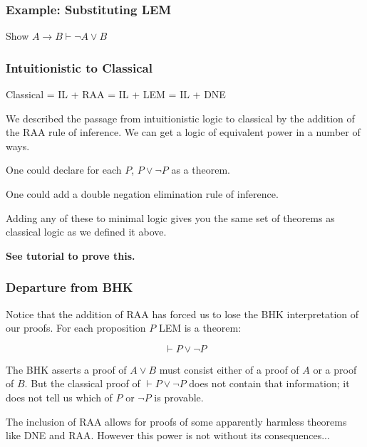 \documentclass{beamer}
\theoremstyle{indentDefn} \newtheorem{defn}[]{Definition}
\begin{document}
\begin{frame}
	\frametitle{Example: Substituting LEM}
	
	Show $A \rightarrow B \vdash \lnot A \lor B$
	
	\vspace{7cm}
		
	
\end{frame}

\begin{frame}
  \frametitle{Intuitionistic to Classical}

  	\begin{center}
	Classical = IL + RAA = IL + LEM = IL + DNE
	\end{center}

	\vspace{0.3cm}

    We described the passage from intuitionistic logic to classical by the addition of the RAA rule of inference. We can get a logic of equivalent power in a number of ways. 

    \vspace{0.3cm}

    One could declare for each $P$,  $P \lor \lnot P$ as a theorem. 

    \vspace{0.3cm}

    One could add a double negation elimination rule of inference. 

    \vspace{0.3cm}

    Adding any of these to minimal logic gives you the same set of theorems as classical logic as we defined it above. 

	{\bf See tutorial to prove this.}

\end{frame}

\begin{frame}
  \frametitle{Departure from BHK}

    Notice that the addition of RAA has forced us to lose the BHK interpretation of our proofs. For each proposition $P$ LEM is a theorem: 

    $$ \vdash P \lor \lnot P$$

    The BHK asserts a proof of $A \lor B$ must consist either of a proof of $A$ or a proof of $B$. But the classical proof of $\vdash P \lor \lnot P$ does not contain that information; it does not tell us which of $P$ or $\lnot P$ is provable. 

	\vspace{0.5cm}

	The inclusion of RAA allows for proofs of some apparently harmless theorems like DNE and RAA. However this power is not without its consequences...

\end{frame}
\end{document}
